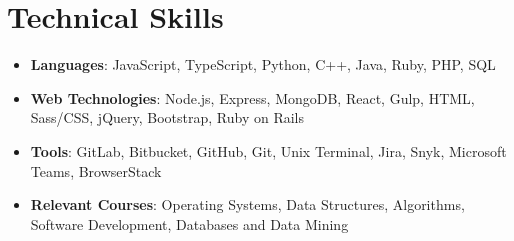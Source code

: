 \documentclass[letterpaper,10.5pt]{article}
\newcommand{\resumeItem}[2]{
  \item\small{
    \textbf{#1}{: #2 \vspace{-2pt}}
  }
}
\newcommand{\resumeSubItem}[2]{\resumeItem{#1}{#2}\vspace{-4pt}}
\newcommand{\resumeSubHeadingListStart}{\begin{itemize}[leftmargin=*, label={}]}
\newcommand{\resumeSubHeadingListEnd}{\end{itemize}}
\begin{document}
\section{Technical Skills}
	\resumeSubHeadingListStart
            \resumeSubItem{Languages}{JavaScript, TypeScript, Python, C++, Java, Ruby, PHP, SQL}
        	\resumeSubItem{Web Technologies}{Node.js, Express, MongoDB, React, Gulp, HTML, Sass/CSS, jQuery, Bootstrap, Ruby on Rails}    
             \resumeSubItem{Tools}{GitLab, Bitbucket, GitHub, Git, Unix Terminal, Jira, Snyk, Microsoft Teams, BrowserStack}
             \resumeSubItem{Relevant Courses}{Operating Systems, Data Structures, Algorithms,  Software Development, Databases and Data Mining}
\resumeSubHeadingListEnd
\end{document}

